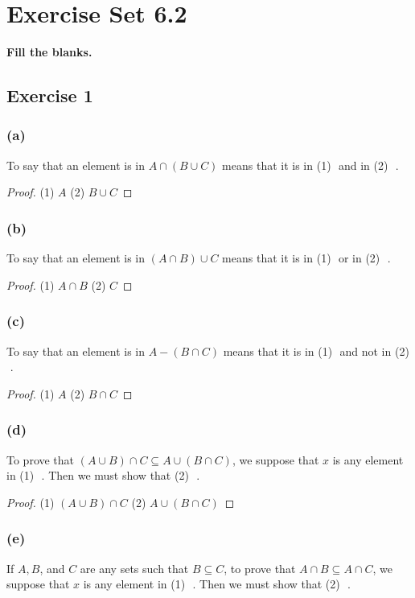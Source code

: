 \documentclass[14pt]{extarticle}
\newcommand{\fbl}{\underline{\hspace{1cm}}\,\,}
\newcommand{\cy}{\color{cyan}}
\begin{document}
\section{Exercise Set 6.2}
 {\bf \cy Fill the blanks.}

\subsection{Exercise 1}
\subsubsection{(a)}
To say that an element is in \(A \cap (B \cup C)\) means that it is in (1) \fbl and in (2) \fbl.

\begin{proof}
  (1) $A$ (2) \(B \cup C\)

\end{proof}

\subsubsection{(b)}
To say that an element is in \((A \cap B) \cup C\) means that it is in (1) \fbl or in (2) \fbl.

\begin{proof}
  (1) \(A \cap B\) (2) $C$
\end{proof}

\subsubsection{(c)}
To say that an element is in \(A - (B \cap C)\) means that it is in (1) \fbl and not in (2) \fbl.

\begin{proof}
  (1) $A$ (2) \(B \cap C\)
\end{proof}

\subsubsection{(d)}
To prove that \((A \cup B) \cap C \subseteq A \cup (B \cap C)\), we suppose that $x$ is any element in (1) \fbl.
Then we must show that (2) \fbl.

\begin{proof}
  (1) \((A \cup B) \cap C\) (2) \(A \cup (B \cap C)\)
\end{proof}

\subsubsection{(e)}
If $A, B$, and $C$ are any sets such that \(B \subseteq C\), to prove that \(A \cap B \subseteq A \cap C\), we
suppose that $x$ is any element in (1) \fbl. Then we must show that (2) \fbl.
\end{document}
